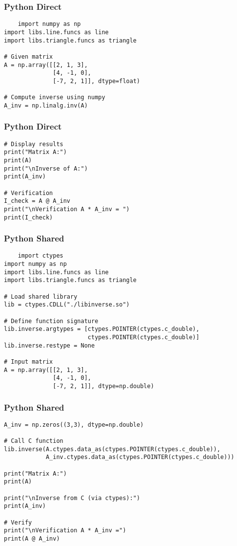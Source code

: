 \documentclass{beamer}
\begin{document}
\begin{frame}[fragile]
    \frametitle{Python Direct}
    \begin{lstlisting}
    import numpy as np
import libs.line.funcs as line
import libs.triangle.funcs as triangle

# Given matrix
A = np.array([[2, 1, 3],
              [4, -1, 0],
              [-7, 2, 1]], dtype=float)

# Compute inverse using numpy
A_inv = np.linalg.inv(A)
\end{lstlisting}
\end{frame}
\begin{frame}[fragile]
    \frametitle{Python Direct}
    \begin{lstlisting}
# Display results
print("Matrix A:")
print(A)
print("\nInverse of A:")
print(A_inv)

# Verification
I_check = A @ A_inv
print("\nVerification A * A_inv = ")
print(I_check)

    \end{lstlisting}
\end{frame}
\begin{frame}[fragile]
    \frametitle{Python Shared}
    \begin{lstlisting}
    import ctypes
import numpy as np
import libs.line.funcs as line
import libs.triangle.funcs as triangle

# Load shared library
lib = ctypes.CDLL("./libinverse.so")

# Define function signature
lib.inverse.argtypes = [ctypes.POINTER(ctypes.c_double),
                        ctypes.POINTER(ctypes.c_double)]
lib.inverse.restype = None

# Input matrix
A = np.array([[2, 1, 3],
              [4, -1, 0],
              [-7, 2, 1]], dtype=np.double)
  \end{lstlisting}
\end{frame}
\begin{frame}[fragile]
    \frametitle{Python Shared}
    \begin{lstlisting}
A_inv = np.zeros((3,3), dtype=np.double)

# Call C function
lib.inverse(A.ctypes.data_as(ctypes.POINTER(ctypes.c_double)),
            A_inv.ctypes.data_as(ctypes.POINTER(ctypes.c_double)))

print("Matrix A:")
print(A)

print("\nInverse from C (via ctypes):")
print(A_inv)

# Verify
print("\nVerification A * A_inv =")
print(A @ A_inv)

    \end{lstlisting}
\end{frame}
\end{document}
